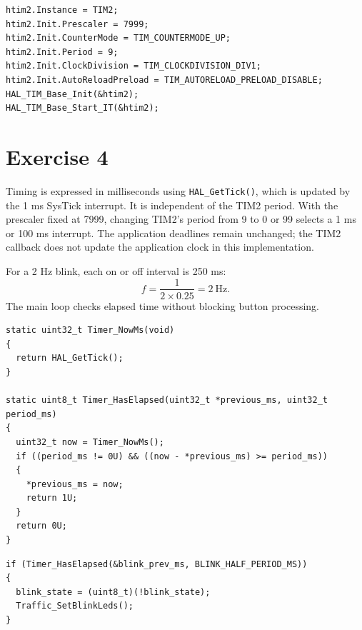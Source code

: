 \documentclass[12pt,a4paper]{article}
\begin{document}
\noindent\begin{minipage}{\linewidth}
\begin{lstlisting}[caption={TIM2 configuration excerpt -- Exercise 3}]
htim2.Instance = TIM2;
htim2.Init.Prescaler = 7999;
htim2.Init.CounterMode = TIM_COUNTERMODE_UP;
htim2.Init.Period = 9;
htim2.Init.ClockDivision = TIM_CLOCKDIVISION_DIV1;
htim2.Init.AutoReloadPreload = TIM_AUTORELOAD_PRELOAD_DISABLE;
HAL_TIM_Base_Init(&htim2);
HAL_TIM_Base_Start_IT(&htim2);
\end{lstlisting}
\end{minipage}

\section{Exercise 4}

Timing is expressed in milliseconds using \texttt{HAL\_GetTick()}, which is
updated by the 1 ms SysTick interrupt. It is independent of the TIM2 period.
With the prescaler fixed at 7999, changing TIM2's period from 9 to 0 or 99
selects a 1 ms or 100 ms interrupt. The application deadlines remain unchanged;
the TIM2 callback does not update the application clock in this implementation.

For a 2 Hz blink, each on or off interval is 250 ms:
\[
f=\frac{1}{2\times0.25}=2\ \mathrm{Hz}.
\]
The main loop checks elapsed time without blocking button processing.

\noindent\begin{minipage}{\linewidth}
\begin{lstlisting}[caption={Millisecond timing -- Exercise 4}]
static uint32_t Timer_NowMs(void)
{
  return HAL_GetTick();
}

static uint8_t Timer_HasElapsed(uint32_t *previous_ms, uint32_t period_ms)
{
  uint32_t now = Timer_NowMs();
  if ((period_ms != 0U) && ((now - *previous_ms) >= period_ms))
  {
    *previous_ms = now;
    return 1U;
  }
  return 0U;
}
\end{lstlisting}
\end{minipage}

\noindent\begin{minipage}{\linewidth}
\begin{lstlisting}[caption={Blink timing -- Exercise 4}]
if (Timer_HasElapsed(&blink_prev_ms, BLINK_HALF_PERIOD_MS))
{
  blink_state = (uint8_t)(!blink_state);
  Traffic_SetBlinkLeds();
}
\end{lstlisting}
\end{minipage}
\end{document}
